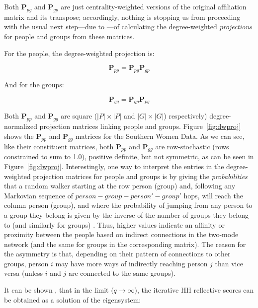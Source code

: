\documentclass[a4paper,fleqn]{cas-sc}
\begin{document}
Both $\mathbf{P}_{pg}$ and $\mathbf{P}_{gp}$ are just centrality-weighted versions of the original affiliation matrix and its transpose; accordingly, nothing is stopping us from proceeding with the usual next step---due to \citet{breiger1974duality}---of calculating the degree-weighted \textit{projections} for people and groups from these matrices. 

For the people, the degree-weighted projection is:

\begin{equation}
\mathbf{P}_{pp} = \mathbf{P}_{pg}\mathbf{P}_{gp}
    \label{eq:ca3}
\end{equation}

And for the groups:

\begin{equation}
    \mathbf{P}_{gg} = \mathbf{P}_{gp}\mathbf{P}_{pg}
    \label{eq:ca4}
\end{equation}

Both $\mathbf{P}_{pp}$ and $\mathbf{P}_{gg}$ are square ($|P| \times |P|$ and $|G| \times |G|$) respectively) degree-normalized projection matrices linking people and groups. Figure~\ref{fig:dwproj} shows the $\mathbf{P}_{pp}$ and $\mathbf{P}_{gg}$ matrices for the Southern Women Data. As we can see, like their constituent matrices, both $\mathbf{P}_{pp}$ and $\mathbf{P}_{gg}$ are row-stochastic (rows constrained to sum to 1.0), positive definite, but not symmetric, as can be seen in Figure~\ref{fig:dwproj}. Interestingly, one way to interpret the entries in the degree-weighted projection matrices for people and groups is by giving the \textit{probabilities} that a random walker starting at the row person (group) and, following any Markovian sequence of $person-group-person'-group'$ hops, will reach the column person (group), and where the probability of jumping from any person to a group they belong is given by the inverse of the number of groups they belong to (and similarly for groups) \citep[240]{deng2009generalized}. Thus, higher values indicate an affinity or proximity between the people based on indirect connections in the two-mode network (and the same for groups in the corresponding matrix). The reason for the asymmetry is that, depending on their pattern of connections to other groups, person $i$ may have more ways of indirectly reaching person $j$ than vice versa (unless $i$ and $j$ are connected to the same groups). 

It can be shown \citep{van2021correspondence}, that in the limit ($q \rightarrow \infty$), the iterative HH reflective scores can be obtained as a solution of the eigensystem:
\end{document}
